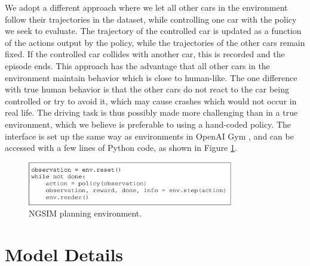 \documentclass{article} %
\begin{document}
We adopt a different approach where we let all other cars in the environment follow their trajectories in the dataset, while controlling one car with the policy we seek to evaluate.
The trajectory of the controlled car is updated as a function of the actions output by the policy, while the trajectories of the other cars remain fixed.
If the controlled car collides with another car, this is recorded and the episode ends.
This approach has the advantage that all other cars in the environment maintain behavior which is close to human-like.
The one difference with true human behavior is that the other cars do not react to the car being controlled or try to avoid it, which may cause crashes which would not occur in real life.
The driving task is thus possibly made more challenging than in a true environment, which we believe is preferable to using a hand-coded policy.
The interface is set up the same way as environments in OpenAI Gym \citep{OpenAIBaselines}, and can be accessed with a few lines of Python code, as shown in Figure \ref{interface}.




\begin{figure}
  \centering
  \includegraphics[width=0.8\textwidth]{figures/driving/traffic_gym_code-crop.pdf}
  \caption{NGSIM planning environment.}
\label{interface}
\end{figure}


\section{Model Details}
\label{model-details}
\end{document}
